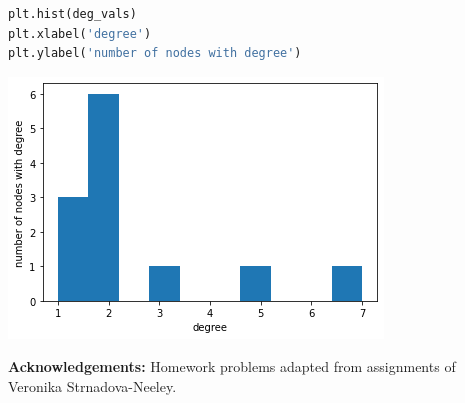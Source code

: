\documentclass[11pt]{article}
\begin{document}
\begin{enumerate}
\begin{lstlisting}[language=Python]
plt.hist(deg_vals)
plt.xlabel('degree')
plt.ylabel('number of nodes with degree')
\end{lstlisting}

    \includegraphics[width=\linewidth]{q7-node-degree.png}

\end{enumerate}

{\bf Acknowledgements:} Homework problems adapted from assignments of
Veronika Strnadova-Neeley.
\end{document}
